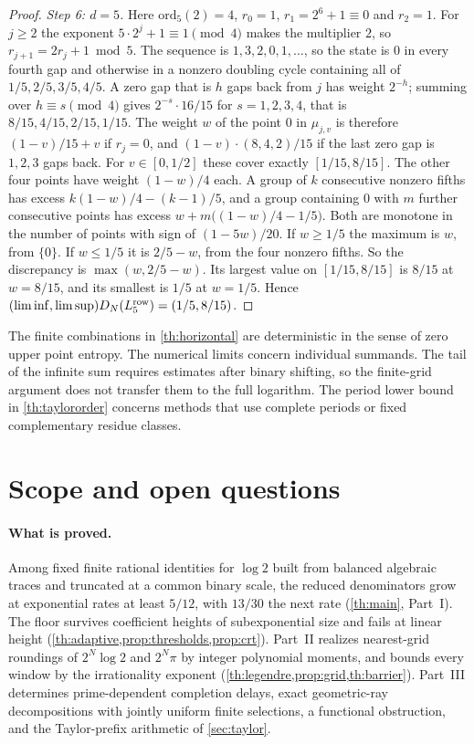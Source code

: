 \documentclass[11pt]{article}
\begin{document}
\begin{proof}
\emph{Step 6: $d=5$.} Here $\mathrm{ord}_5(2)=4$, $r_0=1$, $r_1=2^6+1\equiv0$ and $r_2=1$. For $j\ge2$ the exponent $5\cdot2^j+1\equiv1\pmod4$ makes the multiplier $2$, so $r_{j+1}=2r_j+1\bmod5$. The sequence is $1,3,2,0,1,\dots$, so the state is $0$ in every fourth gap and otherwise in a nonzero doubling cycle containing all of $1/5,2/5,3/5,4/5$. A zero gap that is $h$ gaps back from $j$ has weight $2^{-h}$; summing over $h\equiv s\pmod4$ gives $2^{-s}\cdot16/15$ for $s=1,2,3,4$, that is $8/15,4/15,2/15,1/15$. The weight $w$ of the point $0$ in $\mu_{j,v}$ is therefore $(1-v)/15+v$ if $r_j=0$, and $(1-v)\cdot(8,4,2)/15$ if the last zero gap is $1,2,3$ gaps back. For $v\in[0,1/2]$ these cover exactly $[1/15,8/15]$. The other four points have weight $(1-w)/4$ each. A group of $k$ consecutive nonzero fifths has excess $k(1-w)/4-(k-1)/5$, and a group containing $0$ with $m$ further consecutive points has excess $w+m\bigl((1-w)/4-1/5\bigr)$. Both are monotone in the number of points with sign of $(1-5w)/20$. If $w\ge1/5$ the maximum is $w$, from $\{0\}$. If $w\le1/5$ it is $2/5-w$, from the four nonzero fifths. So the discrepancy is $\max(w,2/5-w)$. Its largest value on $[1/15,8/15]$ is $8/15$ at $w=8/15$, and its smallest is $1/5$ at $w=1/5$. Hence $(\liminf,\limsup)D_N(L_5^{\rm row})=(1/5,8/15)$.
\end{proof}


The finite combinations in \cref{th:horizontal} are deterministic in the sense of zero upper point entropy. The numerical limits concern individual summands. The tail of the infinite sum requires estimates after binary shifting, so the finite-grid argument does not transfer them to the full logarithm. The period lower bound in \cref{th:taylororder} concerns methods that use complete periods or fixed complementary residue classes.

\section{Scope and open questions}\label{sec:conclusion}

\paragraph{What is proved.} Among fixed finite rational identities for $\log 2$ built from balanced algebraic traces and truncated at a common binary scale, the reduced denominators grow at exponential rates at least $5/12$, with $13/30$ the next rate (\cref{th:main}, Part~I). The floor survives coefficient heights of subexponential size and fails at linear height (\cref{th:adaptive,prop:thresholds,prop:crt}). Part~II realizes nearest-grid roundings of $2^N\log 2$ and $2^N\pi$ by integer polynomial moments, and bounds every window by the irrationality exponent (\cref{th:legendre,prop:grid,th:barrier}). Part~III determines prime-dependent completion delays, exact geometric-ray decompositions with jointly uniform finite selections, a functional obstruction, and the Taylor-prefix arithmetic of \cref{sec:taylor}.
\end{document}
